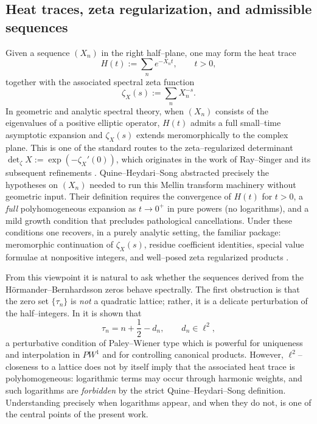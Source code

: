 \documentclass[11pt,letterpaper]{amsart}
\numberwithin{equation}{section}
\theoremstyle{definition}
\begin{document}
\subsection{Heat traces, zeta regularization, and admissible sequences}

Given a sequence $(X_n)$ in the right half--plane, one may form the heat trace
\[
H(t):=\sum_{n}e^{-X_n t},\qquad t>0,
\]
together with the associated spectral zeta function
\[
\zeta_X(s):=\sum_n X_n^{-s}.
\]
In geometric and analytic spectral theory, when $(X_n)$ consists of the eigenvalues of a
positive elliptic operator, $H(t)$ admits a full small--time asymptotic expansion and
$\zeta_X(s)$ extends meromorphically to the complex plane. This is one of the standard
routes to the zeta--regularized determinant $\det_\zeta X:=\exp(-\zeta_X'(0))$, which
originates in the work of Ray--Singer and its subsequent refinements
\cite{RaySinger71,Seeley67,Gilkey95,Voros87}.
Quine--Heydari--Song \cite{QHS} abstracted precisely the hypotheses on $(X_n)$ needed to
run this Mellin transform machinery without geometric input.  Their definition
requires the convergence of $H(t)$ for $t>0$, a \emph{full} polyhomogeneous expansion
as $t\to0^+$ in pure powers (no logarithms), and a mild growth condition that precludes
pathological cancellations.  Under these conditions one recovers, in a purely analytic
setting, the familiar package: meromorphic continuation of $\zeta_X(s)$, residue coefficient identities, special value formulae at nonpositive integers, and well--posed zeta regularized products \cite[\S2--\S4]{QHS}.

From this viewpoint it is natural to ask whether the sequences derived from the
H\"ormander--Bernhardsson zeros behave spectrally.  The first obstruction is that the
zero set $\{\tau_n\}$ is \emph{not} a quadratic lattice; rather, it is a delicate
perturbation of the half--integers.  In \cite{BOCRS} it is shown that
\[
\tau_n = n+\frac12 - d_n,
\qquad d_n\in\ell^2,
\]
a perturbative condition of Paley--Wiener type which is powerful for
uniqueness and interpolation in $PW^1$ and for controlling canonical products.
However, $\ell^2$--closeness to a lattice does not by itself imply that the associated
heat trace is polyhomogeneous: logarithmic terms may occur through harmonic weights,
and such logarithms are \emph{forbidden} by the strict Quine--Heydari--Song definition.
Understanding precisely when logarithms appear, and when they do not, is one of the
central points of the present work.
\end{document}

